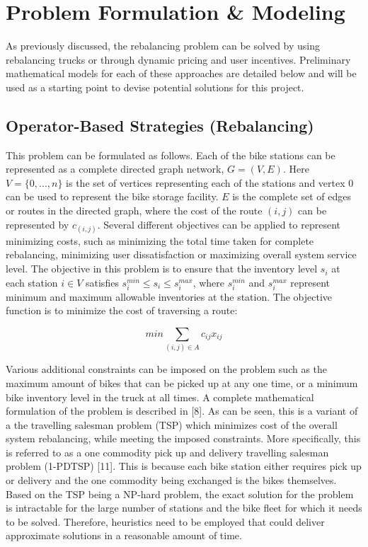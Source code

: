 \documentclass[conference]{IEEEtran}
\begin{document}

\section{Problem Formulation \& Modeling}
As previously discussed, the rebalancing problem can be solved by using rebalancing trucks or through dynamic pricing and user incentives. Preliminary mathematical models for each of these approaches are detailed below and will be used as a starting point to devise potential solutions for this project. 

\subsection{Operator-Based Strategies (Rebalancing)}
This problem can be formulated as follows. Each of the bike stations can be represented as a complete directed graph network, $G = (V, E)$. Here $V = \{0, ... , n\}$ is the set of vertices representing each of the stations and vertex 0 can be used to represent the bike storage facility. $E$ is the complete set of edges or routes in the directed graph, where the cost of the route $(i,j)$ can be represented by $c_{(i,j)}$. Several different objectives can be applied to represent minimizing costs, such as minimizing the total time taken for complete rebalancing, minimizing user dissatisfaction or maximizing overall system service level. The objective in this problem is to ensure that the inventory level $s_{i}$ at each station $i \in V$  satisfies $s_{i}^{min} \leq s_{i} \leq s_{i}^{max}$, where $s_{i}^{min}$ and $s_{i}^{max}$ represent minimum and maximum allowable inventories at the station. The objective function is to minimize the cost of traversing a route: 

\begin{equation}
min \sum_{(i,j)\in A}c_{ij}x_{ij}
\end{equation}

Various additional constraints can be imposed on the problem such as the maximum amount of bikes that can be picked up at any one time, or a minimum bike inventory level in the truck at all times. A complete mathematical formulation of the problem  is described in [8]. As can be seen, this is a variant of a the travelling salesman problem (TSP) which minimizes cost of the overall system rebalancing, while meeting the imposed constraints. More specifically, this is referred to as a one commodity pick up and delivery travelling salesman problem (1-PDTSP) [11]. This is because each bike station either requires pick up or delivery and the one commodity being exchanged is the bikes themselves. Based on the TSP being a NP-hard problem, the exact solution for the problem is intractable for the large number of stations and the bike fleet for which it needs to be solved. Therefore, heuristics need to be employed that could deliver approximate solutions in a reasonable amount of time.   
\end{document}
